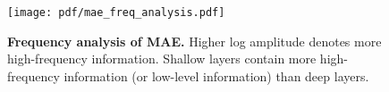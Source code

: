 \begin{figure}[t!]
\centering
\texttt{[image: pdf/mae\_freq\_analysis.pdf]}
\caption{\textbf{Frequency analysis of MAE.} Higher log amplitude denotes more high-frequency information. Shallow layers contain more high-frequency information (or low-level information) than deep layers.}
\label{fig:freq_ana}
\end{figure}
